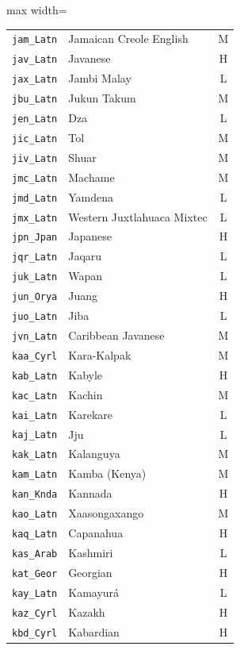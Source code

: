 {\begin{adjustbox}{max width=\textwidth}
\begin{tabular}{llc}
        \texttt{jam\_Latn} & Jamaican Creole English & M \\
        \texttt{jav\_Latn} & Javanese & H \\
        \texttt{jax\_Latn} & Jambi Malay & L \\
        \texttt{jbu\_Latn} & Jukun Takum & M \\
        \texttt{jen\_Latn} & Dza & L \\
        \texttt{jic\_Latn} & Tol & M \\
        \texttt{jiv\_Latn} & Shuar & M \\
        \texttt{jmc\_Latn} & Machame & M \\
        \texttt{jmd\_Latn} & Yamdena & L \\
        \texttt{jmx\_Latn} & Western Juxtlahuaca Mixtec & L \\
        \texttt{jpn\_Jpan} & Japanese & H \\
        \texttt{jqr\_Latn} & Jaqaru & L \\
        \texttt{juk\_Latn} & Wapan & L \\
        \texttt{jun\_Orya} & Juang & H \\
        \texttt{juo\_Latn} & Jiba & L \\
        \texttt{jvn\_Latn} & Caribbean Javanese & M \\
        \texttt{kaa\_Cyrl} & Kara-Kalpak & M \\
        \texttt{kab\_Latn} & Kabyle & H \\
        \texttt{kac\_Latn} & Kachin & M \\
        \texttt{kai\_Latn} & Karekare & L \\
        \texttt{kaj\_Latn} & Jju & L \\
        \texttt{kak\_Latn} & Kalanguya & M \\
        \texttt{kam\_Latn} & Kamba (Kenya) & M \\
        \texttt{kan\_Knda} & Kannada & H \\
        \texttt{kao\_Latn} & Xaasongaxango & M \\
        \texttt{kaq\_Latn} & Capanahua & H \\
        \texttt{kas\_Arab} & Kashmiri & L \\
        \texttt{kat\_Geor} & Georgian & H \\
        \texttt{kay\_Latn} & Kamayurá & L \\
        \texttt{kaz\_Cyrl} & Kazakh & H \\
        \texttt{kbd\_Cyrl} & Kabardian & H \\

\end{tabular}
\end{adjustbox}}
